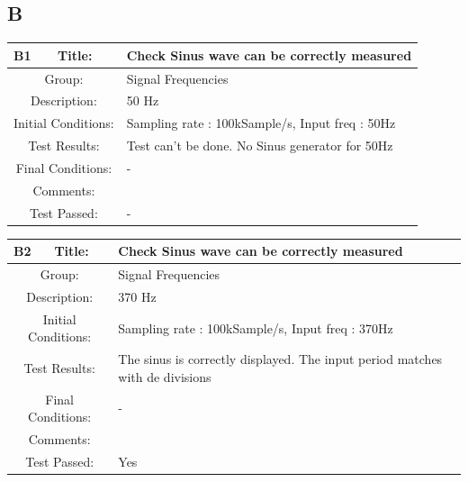 \documentclass[12pt]{article}
\begin{document}
	\subsection{B}
	\begin{table}[H]
		\begin{center}
			\begin{tabular}{| m{2cm}|m{2cm}|m{12cm}|}
				\hline 
				\bf B1&\bf Title:&\bf Check Sinus wave can be correctly measured\\ 
				\hline 
				\multicolumn{2}{|c|}{Group:}&Signal Frequencies\\ 
				\hline 
				\multicolumn{2}{|c|}{Description:}&50 Hz\\ 
				\hline 
				\multicolumn{2}{|c|}{Initial Conditions:}&Sampling rate : 100kSample/s, Input freq : 50Hz\\ 
				\hline 
				\multicolumn{2}{|c|}{Test Results:}&Test can't be done. No Sinus generator for 50Hz\\ 
				\hline 
				\multicolumn{2}{|c|}{Final Conditions:}&-\\ 
				\hline 
				\multicolumn{2}{|c|}{Comments:}&\\ 
				\hline 
				\multicolumn{2}{|c|}{Test Passed:}&-\\ 
				\hline 
			\end{tabular} 
		\end{center}
	\end{table}	
	\begin{table}[H]
	\begin{center}
		\begin{tabular}{| m{2cm}|m{2cm}|m{12cm}|}
			\hline 
			\bf B2&\bf Title:&\bf Check Sinus wave can be correctly measured\\ 
			\hline 
			\multicolumn{2}{|c|}{Group:}&Signal Frequencies\\ 
			\hline 
			\multicolumn{2}{|c|}{Description:}&370 Hz\\ 
			\hline 
			\multicolumn{2}{|c|}{Initial Conditions:}&Sampling rate : 100kSample/s, Input freq : 370Hz\\ 
			\hline 
			\multicolumn{2}{|c|}{Test Results:}&The sinus is correctly displayed. The input period matches with de divisions\\ 
			\hline 
			\multicolumn{2}{|c|}{Final Conditions:}&-\\ 
			\hline 
			\multicolumn{2}{|c|}{Comments:}&\\ 
			\hline 
			\multicolumn{2}{|c|}{Test Passed:}&Yes\\ 
			\hline 
		\end{tabular} 
	\end{center}
\end{table}	
\end{document}
